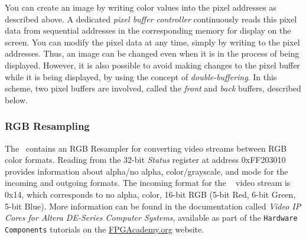 You can create an image by writing color values into the pixel addresses as described
above. A dedicated {\it pixel buffer controller} continuously reads this pixel 
data from sequential addresses in the corresponding
memory for display on the screen.  You can modify the pixel data at any time, simply
by writing to the pixel addresses. Thus, an image can be changed even when it is in the
process of being displayed.  However, it is also possible to avoid making changes to 
the pixel buffer while it is being displayed, by using the concept of {\it
double-buffering}.  In this scheme, two pixel buffers are involved, called the {\it front} 
and {\it back} buffers, described below.

\subsubsection{RGB Resampling}
The \systemName~contains an RGB Resampler for converting video streams between RGB color
formats. Reading from the 32-bit \textit{Status} register at address {\sf 0xFF203010}
provides information about alpha/no alpha, color/grayscale, and mode for the incoming and
outgoing formats. The incoming format for the \systemName~ video stream is {\sf 0x14},
which corresponds to no alpha, color, 16-bit RGB (5-bit Red, 6-bit Green, 5-bit Blue). 
More information can be found in the documentation called 
{\it Video IP Cores for Altera DE-Series Computer Systems}, available as part of the
\texttt{Hardware Components} tutorials on the 
{\small \href{https://www.fpgacademy.org/tutorials.html} {FPGAcademy.org}} website.


